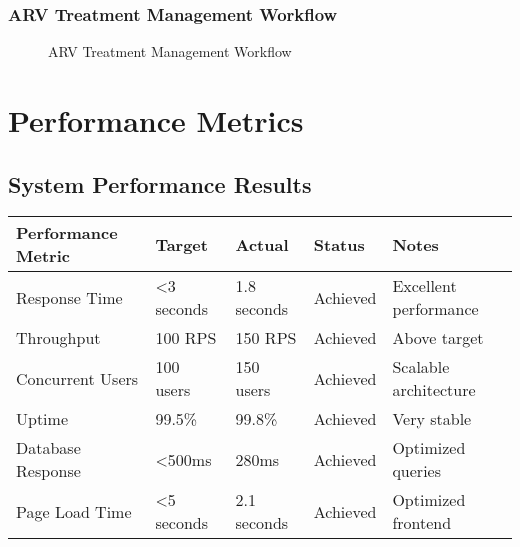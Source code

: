\documentclass[12pt,a4paper]{article}
\begin{document}
\subsubsection{ARV Treatment Management Workflow}

\begin{figure}[H]
\centering
{}
\caption{ARV Treatment Management Workflow}
\label{fig:arv-treatment-workflow}
\end{figure}

\section{Performance Metrics}

\subsection{System Performance Results}

\begin{longtable}{|p{4cm}|p{3cm}|p{3cm}|p{3cm}|p{3cm}|}
\hline
\rowcolor{lightgray}
\textbf{Performance Metric} & \textbf{Target} & \textbf{Actual} & \textbf{Status} & \textbf{Notes} \\
\hline
Response Time & <3 seconds & 1.8 seconds & \cellcolor{completedgreen}Achieved & Excellent performance \\
\hline
Throughput & 100 RPS & 150 RPS & \cellcolor{completedgreen}Achieved & Above target \\
\hline
Concurrent Users & 100 users & 150 users & \cellcolor{completedgreen}Achieved & Scalable architecture \\
\hline
Uptime & 99.5\% & 99.8\% & \cellcolor{completedgreen}Achieved & Very stable \\
\hline
Database Response & <500ms & 280ms & \cellcolor{completedgreen}Achieved & Optimized queries \\
\hline
Page Load Time & <5 seconds & 2.1 seconds & \cellcolor{completedgreen}Achieved & Optimized frontend \\
\hline
\end{longtable}
\end{document}
